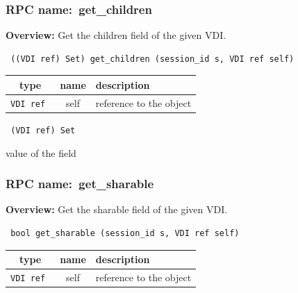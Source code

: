 \subsubsection{RPC name:~get\_children}

{\bf Overview:} 
Get the children field of the given VDI.

\begin{verbatim} ((VDI ref) Set) get_children (session_id s, VDI ref self)\end{verbatim}



 
\vspace{0.3cm}
\begin{tabular}{|c|c|p{7cm}|}
 \hline
{\bf type} & {\bf name} & {\bf description} \\ \hline
{\tt VDI ref } & self & reference to the object \\ \hline 

\end{tabular}

\vspace{0.3cm}

{\tt 
(VDI ref) Set
}


value of the field
\vspace{0.3cm}
\vspace{0.3cm}
\vspace{0.3cm}
\subsubsection{RPC name:~get\_sharable}

{\bf Overview:} 
Get the sharable field of the given VDI.

\begin{verbatim} bool get_sharable (session_id s, VDI ref self)\end{verbatim}



 
\vspace{0.3cm}
\begin{tabular}{|c|c|p{7cm}|}
 \hline
{\bf type} & {\bf name} & {\bf description} \\ \hline
{\tt VDI ref } & self & reference to the object \\ \hline 

\end{tabular}

\vspace{0.3cm}

